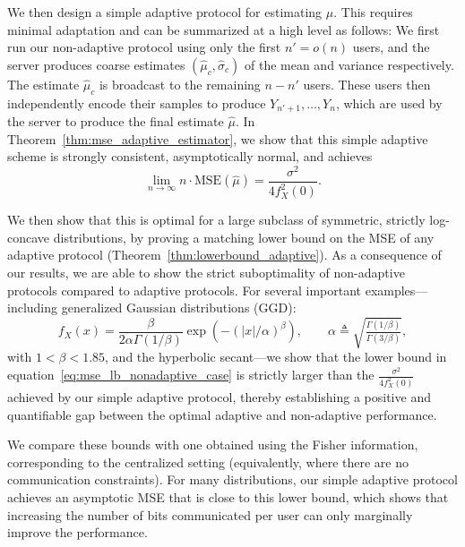 \documentclass[10pt]{article} %
\def\eqref#1{equation~\ref{#1}}
\theoremstyle{plain}
\theoremstyle{definition}
\theoremstyle{remark}
\newcommand{\rkcomment}[1]{\textcolor{blue}{RK: #1}}
\begin{document}
\par We then design a simple adaptive protocol for estimating $\mu$. This requires minimal adaptation and can be summarized at a high level as follows: We first run our non-adaptive protocol using only the first $n' = o(n)$ users, and the server produces coarse estimates $(\hat{\mu}_c, \hat{\sigma}_c)$ of the mean and variance respectively. The estimate $\hat{\mu}_c$ is broadcast to the remaining $n-n'$ users. These users then independently encode their samples to produce $Y_{n'+1},\ldots,Y_n$, which are used by the server to produce the final estimate $\hat{\mu}$.
In Theorem~\ref{thm:mse_adaptive_estimator}, we show that this simple adaptive scheme is strongly consistent, asymptotically normal, and achieves 
\begin{equation}\label{eq:mse_lb_adaptive_1}
\lim_{n\to\infty}n\cdot \mathrm{MSE}(\hat{\mu}) = \frac{\sigma^2}{4f_X^2(0)}.
\end{equation} 
\par We then show that this is optimal for a large subclass of symmetric, strictly log-concave distributions, by proving a matching lower bound on the MSE of any adaptive protocol (Theorem~\ref{thm:lowerbound_adaptive}).  
As a consequence of our results, we are able to show the strict suboptimality of non-adaptive protocols compared to adaptive protocols.  
For several important examples---including generalized Gaussian distributions (GGD):
\begin{equation}
f_X(x) = \frac{\beta}{2\alpha \Gamma(1/\beta)} \exp \left(-(|x|/\alpha)^\beta\right), 
\qquad \alpha \triangleq \sqrt{\tfrac{\Gamma(1/\beta)}{\Gamma(3/\beta)}}, \label{def:GGD}
\end{equation}
with $1 < \beta < 1.85$,
and the hyperbolic secant---we show that the lower bound in \eqref{eq:mse_lb_nonadaptive_case} 
is strictly larger than the $\tfrac{\sigma^2}{4f_X^2(0)}$ achieved by our simple adaptive protocol, thereby establishing a positive and quantifiable gap between the optimal adaptive and non-adaptive performance.

\par We compare these bounds with one obtained using the Fisher information, corresponding to the centralized setting (equivalently, where there are no communication constraints). For many distributions, our simple adaptive protocol achieves an asymptotic MSE that is close to this lower bound, which shows that increasing the number of bits communicated per user can only marginally improve the performance.
\end{document}
